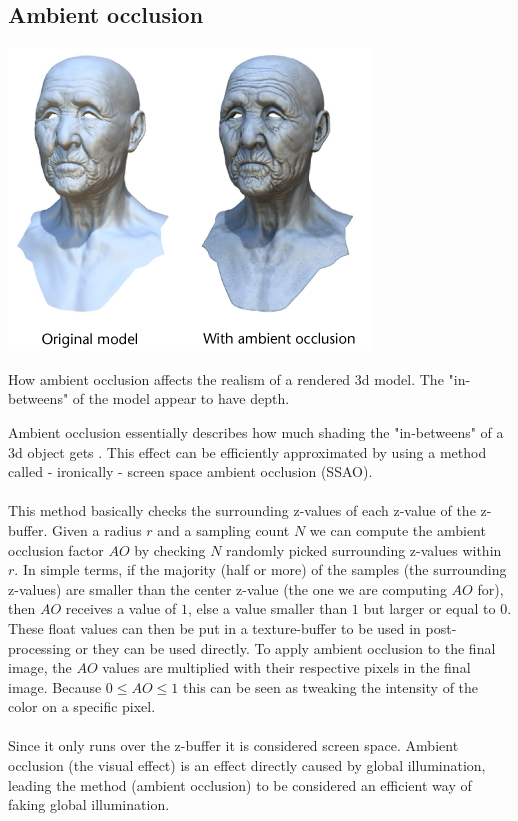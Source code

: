 \documentclass{ACGSeminar}
\begin{document}
	\subsection{Ambient occlusion}
		\begin{floatingfigure}[r]{.5\textwidth}%
			\includegraphics[width=.5\textwidth]{img/ambient_occlusion.png}%

			\caption{How ambient occlusion affects the realism of a rendered 3d model. The "in-betweens" of the model appear to have depth.}%
			\label{fig:ambient_occlusion}%
		\end{floatingfigure}%

		Ambient occlusion essentially describes how much shading the "in-betweens" of a 3d object gets \cite{AOM}. This effect can be efficiently approximated by using a method called - ironically - screen space ambient occlusion (SSAO). \\\\
		This method basically checks the surrounding z-values of each z-value of the z-buffer. Given a radius $r$ and a sampling count $N$ we can compute the ambient occlusion factor $AO$ by checking $N$ randomly picked surrounding z-values within $r$. In simple terms, if the majority (half or more) of the samples (the surrounding z-values) are smaller than the center z-value (the one we are computing $AO$ for), then $AO$ receives a value of $1$, else a value smaller than $1$ but larger or equal to $0$. These float values can then be put in a texture-buffer to be used in post-processing or they can be used directly. To apply ambient occlusion to the final image, the $AO$ values are multiplied with their respective pixels in the final image. Because $0 \leq AO \leq 1$ this can be seen as tweaking the intensity of the color on a specific pixel. \\\\
		Since it only runs over the z-buffer it is considered screen space. Ambient occlusion (the visual effect) is an effect directly caused by global illumination, leading the method (ambient occlusion) to be considered an efficient way of faking global illumination.
\end{document}
